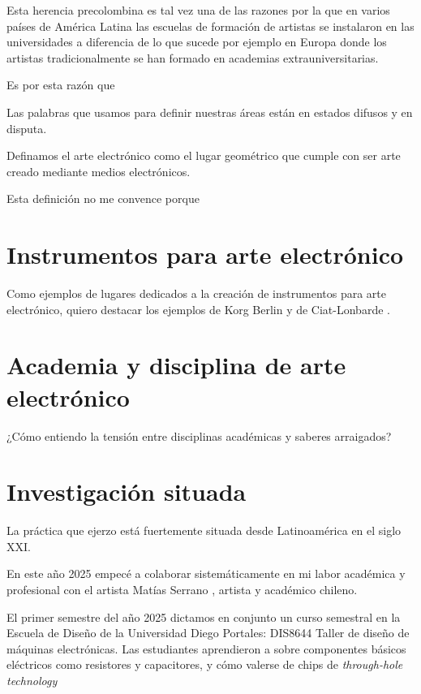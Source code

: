 \documentclass{article}
\begin{document}
\begin{displayquote}
    Esta herencia precolombina es tal vez una de las razones por la que en varios países de América Latina las escuelas de formación de artistas se instalaron en las universidades a diferencia de lo que sucede por ejemplo en Europa donde los artistas tradicionalmente se han formado en academias extrauniversitarias.
\end{displayquote}

Es por esta razón que 

Las palabras que usamos para definir nuestras áreas están en estados difusos y en disputa.

Definamos el arte electrónico como el lugar geométrico que cumple con ser arte creado mediante medios electrónicos.

Esta definición no me convence porque 

\clearpage

\section{Instrumentos para arte electrónico}

Como ejemplos de lugares dedicados a la creación de instrumentos para arte electrónico, quiero destacar los ejemplos de Korg Berlin \cite{korgBerlin} y de Ciat-Lonbarde \cite{ciatLonbarde}.

\clearpage

\section{Academia y disciplina de arte electrónico}

¿Cómo entiendo la tensión entre disciplinas académicas y saberes arraigados?

\clearpage

\section{Investigación situada}

La práctica que ejerzo está fuertemente situada desde Latinoamérica en el siglo XXI.

En este año 2025 empecé a colaborar sistemáticamente en mi labor académica y profesional con el artista Matías Serrano \cite{misaa}, artista y académico chileno.

El primer semestre del año 2025 dictamos en conjunto un curso semestral en la Escuela de Diseño de la Universidad Diego Portales: DIS8644 Taller de diseño de máquinas electrónicas. Las estudiantes aprendieron a sobre componentes básicos eléctricos como resistores y capacitores, y cómo valerse de chips de \textit{through-hole technology} \cite{tht}
\end{document}
